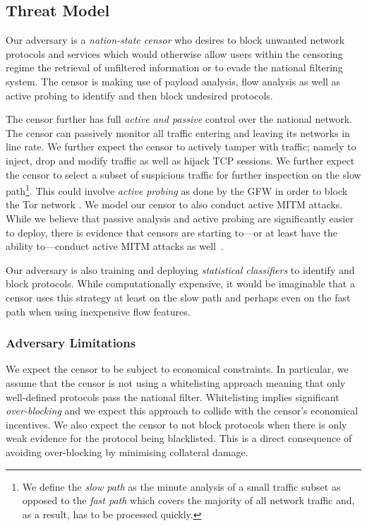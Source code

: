 \documentclass{sig-alternate}
\numberwithin{enumi}{section}
\numberwithin{notesctr}{section}
\begin{document}
\subsection{Threat Model}
Our adversary is a \emph{nation-state censor} who desires to block unwanted network protocols and
services which would otherwise allow users within the censoring regime the retrieval of unfiltered
information or to evade the national filtering system. The censor is making use of payload analysis,
flow analysis as well as active probing to identify and then block undesired protocols.

The censor further has full \emph{active and passive} control over the national network. The censor
can passively monitor all traffic entering and leaving its networks in line rate. We further expect
the censor to actively tamper with traffic; namely to inject, drop and modify traffic as well as
hijack TCP sessions. We further expect the censor to select a subset of suspicious traffic for
further inspection on the slow path\footnote{We define the \emph{slow path} as the minute analysis
of a small traffic subset as opposed to the \emph{fast path} which covers the majority of all
network traffic and, as a result, has to be processed quickly.}. This could involve \emph{active
probing} as done by the GFW in order to block the Tor network \cite{Winter2012}. We model our censor
to also conduct active MITM attacks. While we believe that passive analysis and active probing
are significantly easier to deploy, there is evidence that censors are starting to---or at least
have the ability to---conduct active MITM attacks as well~\cite{gfwmitm}.

Our adversary is also training and deploying \emph{statistical classifiers} to identify and block
protocols. While computationally expensive, it would be imaginable that a censor uses this strategy
at least on the slow path and perhaps even on the fast path when using inexpensive flow features.

\subsubsection{Adversary Limitations}
We expect the censor to be subject to economical constraints. In particular, we assume that the
censor is not using a whitelisting approach meaning that only well-defined protocols pass the
national filter. Whitelisting implies significant \emph{over-blocking} and we expect this approach
to collide with the censor's economical incentives. We also expect the censor to not block protocols
when there is only weak evidence for the protocol being blacklisted. This is a direct consequence of
avoiding over-blocking by minimising collateral damage.
\end{document}
